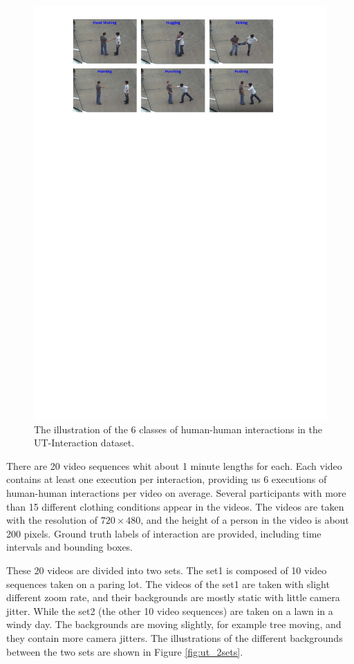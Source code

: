 \begin{figure}
	\includegraphics[trim=2cm 22cm 0cm 1cm]{figs/ut_6classes.pdf}
	\caption{The illustration of the 6 classes of  human-human interactions in the UT-Interaction dataset.}
	\label{fig:ut_6classes}
\end{figure}
 There are 20 video sequences whit about 1 minute lengths for each. Each video contains at least one execution per interaction, providing us 6 executions of human-human interactions per video on average. Several participants with more than 15 different clothing conditions appear in the videos. The videos are taken with the resolution of \(720 \times 480\), and the height of a person in the video is about 200 pixels. Ground truth labels of interaction are provided, including time intervals and bounding boxes. 
 \par 
 These 20 videos are divided into two sets. The set1 is composed of 10 video sequences taken on a paring lot. The videos of the set1 are taken with slight different zoom rate, and their backgrounds are mostly static with little camera jitter. While the set2 (the other 10 video sequences) are taken on a lawn in a windy day. The backgrounds are moving slightly, for example tree moving, and they contain more camera jitters. The illustrations of the different backgrounds between the two sets are shown in Figure \ref{fig:ut_2sets}.
